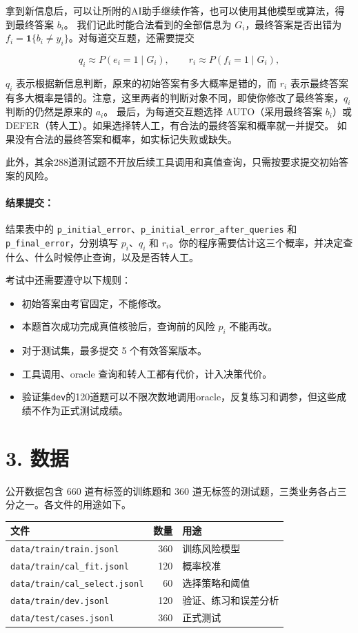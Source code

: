 \documentclass[11pt,a4paper]{article}
\newcounter{none} %
\providecommand{\tightlist}{\setlength{\itemsep}{3pt}\setlength{\parskip}{0pt}}
\begin{document}
拿到新信息后，可以让所附的AI助手继续作答，也可以使用其他模型或算法，得到最终答案 \(b_i\)。
我们记此时能合法看到的全部信息为 \(G_i\)，最终答案是否出错为
\(f_i=\mathbf 1\{b_i\neq y_i\}\)。对每道交互题，还需要提交

\[
q_i\approx P(e_i=1\mid G_i),\qquad r_i\approx P(f_i=1\mid G_i),
\]

\(q_i\) 表示根据新信息判断，原来的初始答案有多大概率是错的，而 \(r_i\)
表示最终答案有多大概率是错的。注意，这里两者的判断对象不同，即使你修改了最终答案，\(q_i\)
判断的仍然是原来的 \(a_i\)。
最后，为每道交互题选择 AUTO（采用最终答案 \(b_i\)）或
DEFER（转人工）。如果选择转人工，有合法的最终答案和概率就一并提交。
如果没有合法的最终答案和概率，如实标记失败或缺失。

此外，其余288道测试题不开放后续工具调用和真值查询，只需按要求提交初始答案的风险。

\paragraph{结果提交：}
结果表中的
\texttt{p\_initial\_error}、\texttt{p\_initial\_error\_after\_queries}
和 \texttt{p\_final\_error}，分别填写 \(p_i\)、\(q_i\) 和
\(r_i\)。你的程序需要估计这三个概率，并决定查什么、什么时候停止查询，以及是否转人工。

考试中还需要遵守以下规则：

\begin{itemize}
\tightlist
\item
  初始答案由考官固定，不能修改。
\item
  本题首次成功完成真值核验后，查询前的风险 \(p_i\) 不能再改。
\item
  对于测试集，最多提交 5 个有效答案版本。
\item
  工具调用、oracle 查询和转人工都有代价，计入决策代价。
\item
  验证集\texttt{dev}的120道题可以不限次数地调用oracle，反复练习和调参，但这些成绩不作为正式测试成绩。
\end{itemize}

\section{3. 数据}\label{ux6570ux636e}

公开数据包含 660 道有标签的训练题和 360
道无标签的测试题，三类业务各占三分之一。各文件的用途如下。

{\small{} %
\begin{longtable}[]{@{}lrl@{}}
\toprule\noalign{}
文件 & 数量 & 用途 \\
\midrule\noalign{}
\endhead
\bottomrule\noalign{}
\endlastfoot
\texttt{data/train/train.jsonl} & 360 & 训练风险模型 \\
\texttt{data/train/cal\_fit.jsonl} & 120 & 概率校准 \\
\texttt{data/train/cal\_select.jsonl} & 60 & 选择策略和阈值 \\
\texttt{data/train/dev.jsonl} & 120 & 验证、练习和误差分析 \\
\texttt{data/test/cases.jsonl} & 360 & 正式测试 \\
\end{longtable}
}
\end{document}
